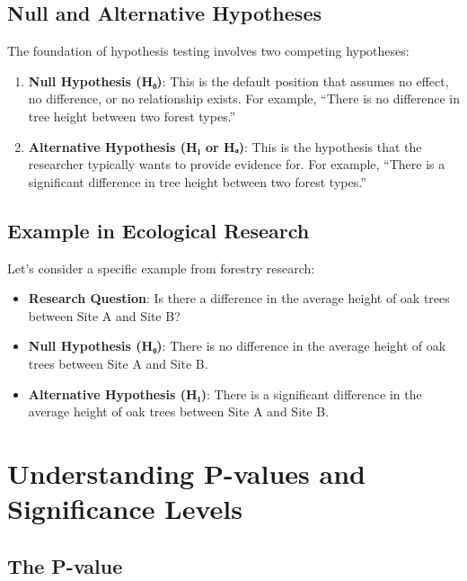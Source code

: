 \documentclass[
  letterpaper,
]{book}
\providecommand{\tightlist}{%
  \setlength{\itemsep}{0pt}\setlength{\parskip}{0pt}}
\begin{document}
\subsection{Null and Alternative
Hypotheses}\label{null-and-alternative-hypotheses}

The foundation of hypothesis testing involves two competing hypotheses:

\begin{enumerate}
\def\labelenumi{\arabic{enumi}.}
\item
  \textbf{Null Hypothesis (H₀)}: This is the default position that
  assumes no effect, no difference, or no relationship exists. For
  example, ``There is no difference in tree height between two forest
  types.''
\item
  \textbf{Alternative Hypothesis (H₁ or Hₐ)}: This is the hypothesis
  that the researcher typically wants to provide evidence for. For
  example, ``There is a significant difference in tree height between
  two forest types.''
\end{enumerate}

\subsection{Example in Ecological
Research}\label{example-in-ecological-research}

Let's consider a specific example from forestry research:

\begin{itemize}
\tightlist
\item
  \textbf{Research Question}: Is there a difference in the average
  height of oak trees between Site A and Site B?
\item
  \textbf{Null Hypothesis (H₀)}: There is no difference in the average
  height of oak trees between Site A and Site B.
\item
  \textbf{Alternative Hypothesis (H₁)}: There is a significant
  difference in the average height of oak trees between Site A and Site
  B.
\end{itemize}

\section{Understanding P-values and Significance
Levels}\label{understanding-p-values-and-significance-levels}

\subsection{The P-value}\label{the-p-value}
\end{document}
